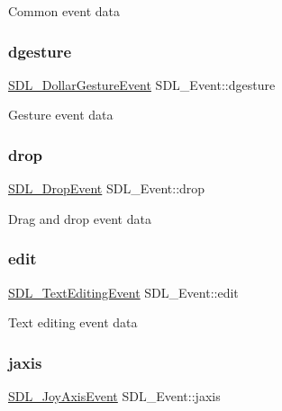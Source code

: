 Common event data \mbox{\label{union_s_d_l___event_a4481167b9f8549aeb254e97ca812e74d}} 
\subsubsection{\texorpdfstring{dgesture}{dgesture}}
{\footnotesize\ttfamily \mbox{\hyperlink{struct_s_d_l___dollar_gesture_event}{S\+D\+L\+\_\+\+Dollar\+Gesture\+Event}} S\+D\+L\+\_\+\+Event\+::dgesture}

Gesture event data \mbox{\label{union_s_d_l___event_acff77bccbca65abbb876360a3f5209c9}} 
\subsubsection{\texorpdfstring{drop}{drop}}
{\footnotesize\ttfamily \mbox{\hyperlink{struct_s_d_l___drop_event}{S\+D\+L\+\_\+\+Drop\+Event}} S\+D\+L\+\_\+\+Event\+::drop}

Drag and drop event data \mbox{\label{union_s_d_l___event_a9a7e3b67b2654d4c5fc509676c6a7183}} 
\subsubsection{\texorpdfstring{edit}{edit}}
{\footnotesize\ttfamily \mbox{\hyperlink{struct_s_d_l___text_editing_event}{S\+D\+L\+\_\+\+Text\+Editing\+Event}} S\+D\+L\+\_\+\+Event\+::edit}

Text editing event data \mbox{\label{union_s_d_l___event_ac4611acd0e9c675e67dc20919f0accb4}} 
\subsubsection{\texorpdfstring{jaxis}{jaxis}}
{\footnotesize\ttfamily \mbox{\hyperlink{struct_s_d_l___joy_axis_event}{S\+D\+L\+\_\+\+Joy\+Axis\+Event}} S\+D\+L\+\_\+\+Event\+::jaxis}

